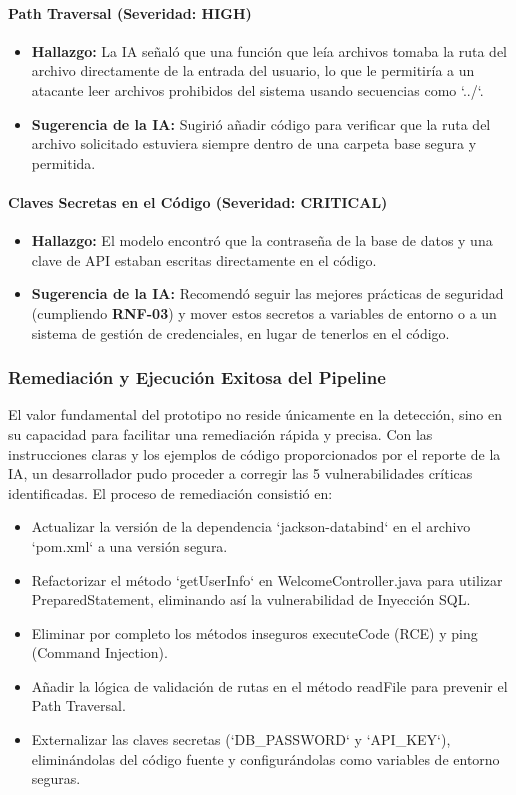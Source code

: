 \paragraph{Path Traversal (Severidad: HIGH)}
\begin{itemize}
    \item \textbf{Hallazgo:} La IA señaló que una función que leía archivos tomaba la ruta del archivo directamente de la entrada del usuario, lo que le permitiría a un atacante leer archivos prohibidos del sistema usando secuencias como `../`.
    \item \textbf{Sugerencia de la IA:} Sugirió añadir código para verificar que la ruta del archivo solicitado estuviera siempre dentro de una carpeta base segura y permitida.
\end{itemize}

\paragraph{Claves Secretas en el Código (Severidad: CRITICAL)}
\begin{itemize}
    \item \textbf{Hallazgo:} El modelo encontró que la contraseña de la base de datos y una clave de API estaban escritas directamente en el código.
    \item \textbf{Sugerencia de la IA:} Recomendó seguir las mejores prácticas de seguridad (cumpliendo \textbf{RNF-03}) y mover estos secretos a variables de entorno o a un sistema de gestión de credenciales, en lugar de tenerlos en el código.
\end{itemize}
\subsubsection{Remediación y Ejecución Exitosa del Pipeline}
\label{subsec:remediacion_exitosa}

El valor fundamental del prototipo no reside únicamente en la detección, sino en su capacidad para facilitar una remediación rápida y precisa. Con las instrucciones claras y los ejemplos de código proporcionados por el reporte de la IA, un desarrollador pudo proceder a corregir las 5 vulnerabilidades críticas identificadas. El proceso de remediación consistió en:
\begin{itemize}
    \item Actualizar la versión de la dependencia `jackson-databind` en el archivo `pom.xml` a una versión segura.
    \item Refactorizar el método `getUserInfo` en WelcomeController.java para utilizar PreparedStatement, eliminando así la vulnerabilidad de Inyección SQL.
    \item Eliminar por completo los métodos inseguros executeCode (RCE) y ping (Command Injection).
    \item Añadir la lógica de validación de rutas en el método readFile para prevenir el Path Traversal.
    \item Externalizar las claves secretas (`DB\_PASSWORD` y `API\_KEY`), eliminándolas del código fuente y configurándolas como variables de entorno seguras.
\end{itemize}

